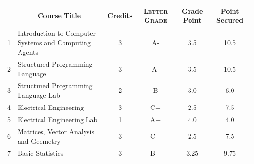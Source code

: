 \documentclass[11pt]{article}
\newcommand*{\numtwo}[1]{\pgfmathprintnumber[
                    fixed, precision=2, fixed zerofill=true]{#1}}
\begin{document}
                \begin{center}
                    \renewcommand{\arraystretch}{1.08}
                    
                \begin{tabular}{|c|l|c|>{\scshape}c|c|c|}
                \hline  \rule[-1ex]{0pt}{3.5ex} {\centering{\bf Course Code}} &  \multicolumn{1}{c|}{\textbf{Course Title}}  & {\bf Credits} & {\bf Letter Grade} & {\bf Grade Point} & {\bf Point Secured}  \\ 
                \hline   1 &  Introduction to Computer Systems and Computing Agents		 & 3 & A- & 3.5 & 10.5 \\ %
                \hline   2 &  Structured Programming Language		 & 3 & A- & 3.5 & 10.5 \\ %
                \hline   3 &  Structured Programming Language Lab		 & 2 & B & 3.0 & 6.0 \\ %
                \hline   4 &  Electrical Engineering		 & 3 & C+ & 2.5 & 7.5 \\ %
                \hline   5 &  Electrical Engineering Lab		 & 1 & A+ & 4.0 & 4.0 \\ %
                \hline   6 &  Matrices, Vector Analysis and Geometry		 & 3 & C+ & 2.5 & 7.5 \\ %
                \hline   7 &  Basic Statistics		 & 3 & B+ & 3.25 & 9.75 \\ %

\hline                %
                \end{tabular}
                \end{center}
                \renewcommand{\arraystretch}{1.03}
\end{document}
